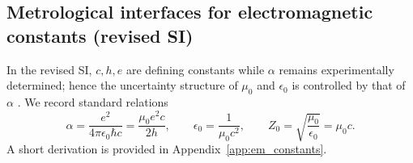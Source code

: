 \subsection{Metrological interfaces for electromagnetic constants (revised SI)}
In the revised SI, $c,h,e$ are defining constants while $\alpha$ remains experimentally determined; hence the uncertainty structure of $\mu_0$ and $\epsilon_0$ is controlled by that of $\alpha$ \cite{BIPMSI2019,NISTMu0RevisedSI,CODATA2022RMP}. We record standard relations
\begin{equation}
\alpha=\frac{e^2}{4\pi\epsilon_0\hbar c}=\frac{\mu_0 e^2 c}{2h},\qquad
\epsilon_0=\frac{1}{\mu_0 c^2},\qquad
Z_0=\sqrt{\frac{\mu_0}{\epsilon_0}}=\mu_0 c.
\end{equation}
A short derivation is provided in Appendix~\ref{app:em_constants}.
